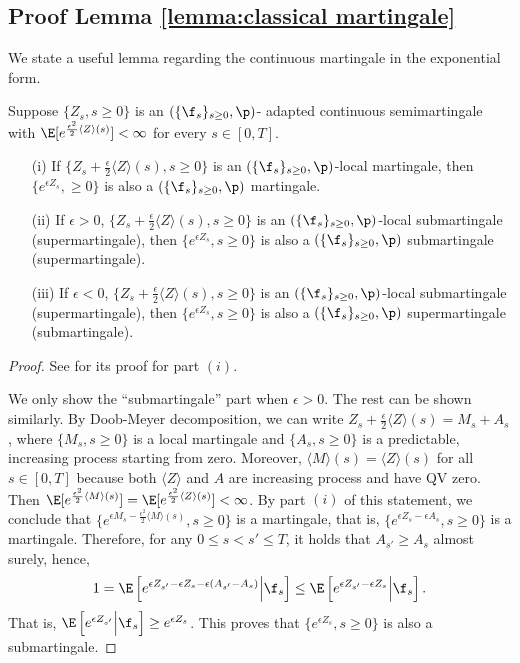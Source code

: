 \subsection{Proof Lemma \ref{lemma:classical martingale}}
We state a useful lemma regarding the continuous martingale in the exponential form. 
\begin{lemma}\label{lemma:exponential martingale}
Suppose $\{Z_s,s\geq 0\}$ is an $(\{\f_s\}_{s\geq 0}, \p)$- adapted continuous semimartingale with $\E[e^{\frac{\epsilon^2}{2}\langle Z \rangle (s)}] < \infty$ for every $s\in [0,T]$. 
\begin{enumerate}
\item[(i)] If $\{Z_s + \frac{\epsilon}{2}\langle Z \rangle(s),s\geq 0\}$ is an $(\{\f_s\}_{s\geq 0}, \p)$-local martingale, then $\{e^{\epsilon Z_s}, \geq 0\}$ is also a $(\{\f_s\}_{s\geq 0}, \p)$ martingale.
\item[(ii)] If $\epsilon > 0$, $\{Z_s + \frac{\epsilon}{2}\langle Z \rangle(s),s\geq 0\}$ is an $(\{\f_s\}_{s\geq 0}, \p)$-local submartingale (supermartingale), then $\{e^{\epsilon Z_s},s\geq 0\}$ is also a $(\{\f_s\}_{s\geq 0}, \p)$ submartingale (supermartingale).
\item[(iii)] If $\epsilon < 0$, $\{Z_s + \frac{\epsilon}{2}\langle Z \rangle(s),s\geq 0\}$ is an $(\{\f_s\}_{s\geq 0}, \p)$-local submartingale (supermartingale), then $\{e^{\epsilon Z_s},s\geq 0\}$ is also a $(\{\f_s\}_{s\geq 0}, \p)$ supermartingale (submartingale).
\end{enumerate}
\end{lemma}

\begin{proof}
See \citet[Chapter VIII, Corollary 1.16, page 309]{revuz2013continuous} for its proof for part $(i)$. 

We only show the ``submartingale'' part when $\epsilon>0$. The rest can be shown similarly. By Doob-Meyer decomposition, we can write $Z_s + \frac{\epsilon}{2}\langle Z \rangle(s) = M_s + A_s$, where $\{M_s,s\geq 0\}$ is a local martingale and $\{A_s,s\geq 0\}$ is a predictable, increasing process starting from zero. Moreover, $\langle M \rangle(s) = \langle Z \rangle(s)$ for all $s\in [0,T]$ because both $\langle Z \rangle$ and $A$ are increasing process and have QV zero. Then $\E[e^{\frac{\epsilon^2}{2}\langle M \rangle (s)}] = \E[e^{\frac{\epsilon^2}{2}\langle Z \rangle (s)}] < \infty$. By part $(i)$ of this statement, we conclude that $\{ e^{\epsilon M_s - \frac{\epsilon^2}{2} \langle M \rangle (s)},s\geq 0 \}$ is a martingale, that is, $\{ e^{\epsilon Z_s - \epsilon A_s},s\geq 0 \}$ is a martingale. Therefore, for any $0\leq s < s' \leq T$, it holds that $A_{s'} \geq A_s$ almost surely, hence,
\[ 1 = \E\left[ e^{\epsilon Z_{s'} - \epsilon Z_s - \epsilon (A_{s'} - A_s)}  \Big|\f_s \right] \leq \E\left[ e^{\epsilon Z_{s'} - \epsilon Z_s}  \Big|\f_s \right] .\]
That is, $\E\left[e^{\epsilon Z_{s'}} \Big| \f_s \right] \geq e^{\epsilon Z_{s}}$. This proves that $\{ e^{\epsilon Z_{s}},s\geq 0\}$ is also a submartingale.
\end{proof}

